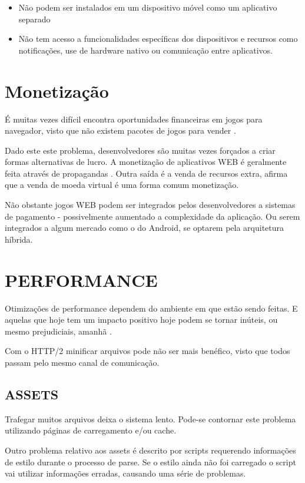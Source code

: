 \begin{itemize}
\item Não podem ser instalados em um dispositivo móvel como um aplicativo separado
\item Não tem acesso a funcionalidades específicas dos dispositivos e recursos como notificações, use de hardware nativo ou comunicação entre aplicativos.
\end{itemize}

\section{Monetização}

É muitas vezes difícil encontra oportunidades financeiras em jogos
para navegador, visto que não existem pacotes de jogos para vender
\autocite[pp. 44]{gameCommunities}.

Dado este  este problema, desenvolvedores são muitas vezes forçados a criar formas alternativas
de lucro. A monetização de aplicativos WEB é geralmente feita através de
propagandas \autocite[pp. 44]{gameCommunities}. Outra saída é a venda
de recursos extra, \cite[pp. 44]{gameCommunities} afirma
que a venda de moeda virtual é uma forma comum monetização.

Não obstante jogos WEB podem ser integrados pelos desenvolvedores
a sistemas de pagamento - possivelmente aumentado a complexidade da
aplicação. Ou serem integrados a algum mercado como o do Android, se
optarem pela arquitetura híbrida.


\section{PERFORMANCE}

Otimizações de performance dependem do ambiente em que estão
sendo feitas. E aquelas que hoje tem um impacto positivo hoje
podem se tornar inúteis, ou mesmo prejudiciais, amanhã
\autocite[pp.131]{html5mostwanted}.

Com o HTTP/2 minificar arquivos pode não ser mais benéfico, visto que
todos passam pelo mesmo canal de comunicação.

\subsection{ASSETS}

Trafegar muitos arquivos deixa o sistema lento. Pode-se contornar este
problema utilizando páginas de carregamento e/ou cache.

Outro problema relativo aos assets é descrito por \cite{howBrowsersWork}
scripts requerendo informações de estilo durante o processo de
parse. Se o estilo ainda não foi carregado o script vai utilizar
informações erradas, causando uma série de problemas.

